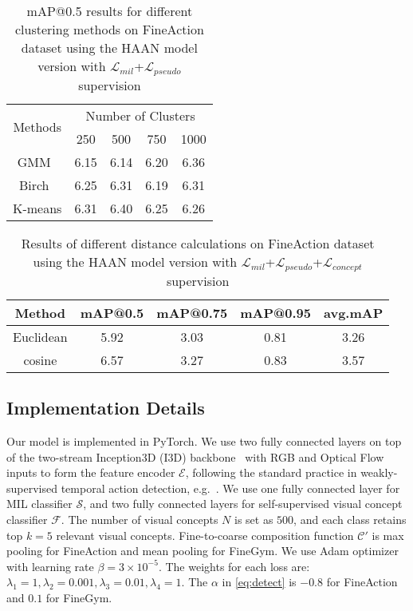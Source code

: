 \begin{table}[t]
  \setlength{\tabcolsep}{6pt}
  \centering
  \caption{mAP@0.5 results for different clustering methods on FineAction dataset using the HAAN model version with $\mathcal{L}_{mil}$+$\mathcal{L}_{pseudo}$ supervision}
  \begin{tabular}{c|cccc}
    \hline
     \multirow{2}{*}{Methods}& \multicolumn{4}{c}{Number of Clusters} \\
     & 250 & 500 & 750 & 1000 \\
    \hline
     GMM~\cite{reynolds2009gaussian} & 6.15 & 6.14 & 6.20 & 6.36\\
     Birch~\cite{zhang1996birch} & 6.25 & 6.31 & 6.19 & 6.31\\
     K-means \cite{macqueen1967classification} & 6.31 & 6.40 & 6.25 & 6.26\\
    \hline
  \end{tabular}
  
  \label{tab:results:clustering}
\end{table}


\begin{table}[t]
  \setlength{\tabcolsep}{6pt}
  \centering
  \caption{Results of different distance calculations on FineAction dataset using the HAAN model version with $\mathcal{L}_{mil}$+$\mathcal{L}_{pseudo}$+$\mathcal{L}_{concept}$ supervision}
  \begin{tabular}{c|ccc|c}
    \hline
   Method & mAP@0.5 & mAP@0.75 & mAP@0.95 & avg.mAP\\
    \hline
     Euclidean & 5.92 & 3.03 & 0.81 & 3.26\\
     cosine & 6.57 & 3.27 & 0.83 & 3.57\\
    \hline
  \end{tabular}
  
  \label{tab:results:mse}
\end{table}



\subsection{Implementation Details}
Our model is implemented in PyTorch. We use two fully connected layers on top of the two-stream Inception3D (I3D) backbone~\cite{carreira2017quo} with RGB and Optical Flow inputs to form the feature encoder $\mathcal{E}$, following the standard practice in weakly-supervised temporal action detection, e.g.~\cite{nguyen2018weakly}. We use one fully connected layer for MIL classifier $\mathcal{S}$, and two fully connected layers for self-supervised visual concept classifier $\mathcal{F}$. The number of visual concepts $N$ is set as $500$, and each class retains top $k=5$ relevant visual concepts. Fine-to-coarse composition function $\mathcal{C'}$ is max pooling for FineAction and mean pooling for FineGym. We use Adam optimizer with learning rate $\beta=3\times10^{-5}$. The weights for each loss are: $\lambda_1=1,\lambda_2=0.001,\lambda_3=0.01,\lambda_4=1$. The $\alpha$ in \cref{eq:detect} is $-0.8$ for FineAction and $0.1$ for FineGym.


